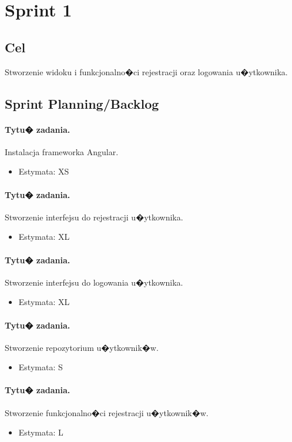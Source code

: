 ﻿\documentclass[a4paper]{article}
\begin{document}
\section{Sprint 1}
\subsection{Cel} Stworzenie widoku i funkcjonalno�ci rejestracji oraz logowania	u�ytkownika.
\subsection{Sprint Planning/Backlog}

\paragraph{Tytu� zadania.} Instalacja frameworka Angular.
\begin{itemize}
\item Estymata: XS
\end{itemize}

\paragraph{Tytu� zadania.} Stworzenie interfejsu do rejestracji u�ytkownika.
\begin{itemize}
\item Estymata: XL
\end{itemize}

\paragraph{Tytu� zadania.} Stworzenie interfejsu do logowania u�ytkownika.
\begin{itemize}
\item Estymata: XL
\end{itemize}

\paragraph{Tytu� zadania.} Stworzenie repozytorium u�ytkownik�w.
\begin{itemize}
\item Estymata: S
\end{itemize}

\paragraph{Tytu� zadania.} Stworzenie funkcjonalno�ci rejestracji u�ytkownik�w.
\begin{itemize}
\item Estymata: L
\end{itemize}
\end{document}
